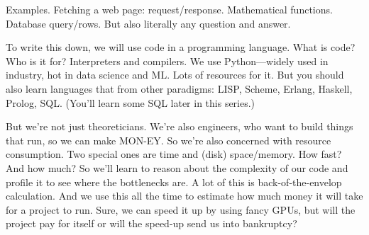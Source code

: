 Examples. Fetching a web page: request/response. Mathematical functions.
Database query/rows. But also literally any question and answer.

To write this down, we will use code in a programming language. What is code?
Who is it for? Interpreters and compilers. We use Python---widely used in
industry, hot in data science and ML. Lots of resources for it. But you should
also learn languages that from other paradigms: LISP, Scheme, Erlang, Haskell,
Prolog, SQL. (You'll learn some SQL later in this series.)

But we're not just theoreticians. We're also engineers, who want to build things
that run, so we can make MON-EY. So we're also concerned with resource
consumption. Two special ones are time and (disk) space/memory. How fast? And
how much? So we'll learn to reason about the complexity of our code and profile
it to see where the bottlenecks are. A lot of this is back-of-the-envelop
calculation. And we use this all the time to estimate how much money it will
take for a project to run. Sure, we can speed it up by using fancy GPUs, but
will the project pay for itself or will the speed-up send us into bankruptcy?

